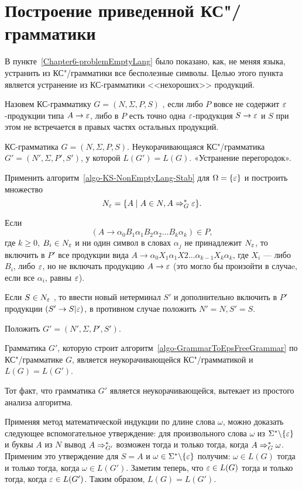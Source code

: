\section{Построение приведенной КС"/грамматики}
\label{Chapter6-normalizeGrammar}

В пункте~\ref{Chapter6-problemEmptyLang} было показано, как, не меняя языка, устранить из КС"/грамматики все бесполезные символы. Целью этого пункта является устранение из КС-грамматики <<нехороших>> продукций.

Назовем КС-грамматику $G=(N,\Sigma,P,S)$ , если либо $P$ вовсе не содержит $\varepsilon$-продукции типа $A\to\varepsilon$, либо в $P$ есть точно одна $\varepsilon$-продукция $S\to\varepsilon$ и $S$ при этом не встречается в правых частях остальных продукций.

{\label{algo-GrammarToEpsFreeGrammar}КС-грамматика $G=(N,\Sigma,P,S)$.}
{Неукорачивающаяся КС"/грамматика $G'=(N',\Sigma,P',S')$, у которой $L(G')=L(G)$.}
{«Устранение перегородок».}
{
\item Применить алгоритм~\ref{algo-KS-NonEmptyLang-Stab} для $\Omega=\{\varepsilon\}$ и построить множество
\[
    N_\varepsilon=\{A\mid A\in N, A\Rightarrow_G^*\varepsilon\}.
\]

\item Если
\[
    (A\to\alpha_0B_1\alpha_1B_2\alpha_2 \ldots B_k\alpha_k)\in P,
\]
где $k\ge 0$, $B_i\in N_\varepsilon$ и ни один символ в словах $\alpha_j$ не принадлежит $N_\varepsilon$, то включить в $P'$ все продукции вида $A\to\alpha_0X_1\alpha_1X2 \ldots \alpha_{k-1}X_k\alpha_k$, где $X_i$ --- либо $B_i$, либо $\varepsilon$, но не включать продукцию $A\to\varepsilon$ (это могло бы произойти в случаe, если все $\alpha_i$, равны $\varepsilon$).

\item Если $S\in N_\varepsilon$ , то ввести новый нетерминал $S'$ и дополнительно включить в $P'$ продукции $(S'\to S|\varepsilon)$, в противном случае положить $N'=N, S'=S$.

\item Положить $G'=(N',\Sigma,P',S')$.
}

\begin{mytheorem}
\label{theorem-AlgoDelEpsProductionsCorrectness}
Грамматика $G'$, которую строит алгоритм~\ref{algo-GrammarToEpsFreeGrammar} по КС"/грамматике $G$, является неукорачивающейся КС"/грамматикой и $L(G)=L(G')$.
\end{mytheorem}

\begin{myproof}
Тот факт, что грамматика $G'$ является неукорачивающейся, вытекает из простого анализа алгоритма.

Применяя метод математической индукции по длине слова $\omega$, можно доказать следующее вспомогательное утверждение: для произвольного слова $\omega$ из $\Sigma^*\backslash\{\varepsilon\}$ и буквы $A$ из $N$ вывод $A\Rightarrow_{G'}^*$ возможен тогда и только тогда, когда $A\Rightarrow_G^*\omega$. Применим это утверждение для $S=A$ и $\omega\in\Sigma^*\backslash\{\varepsilon\}$ получим: $\omega\in L(G)$ тогда и только тогда, когда $\omega\in L(G')$. Заметим теперь, что $\varepsilon\in L(G)$ тогда и только тогда, когда $\varepsilon\in L(G')$. Таким образом, $L(G)=L(G')$.
\end{myproof}

